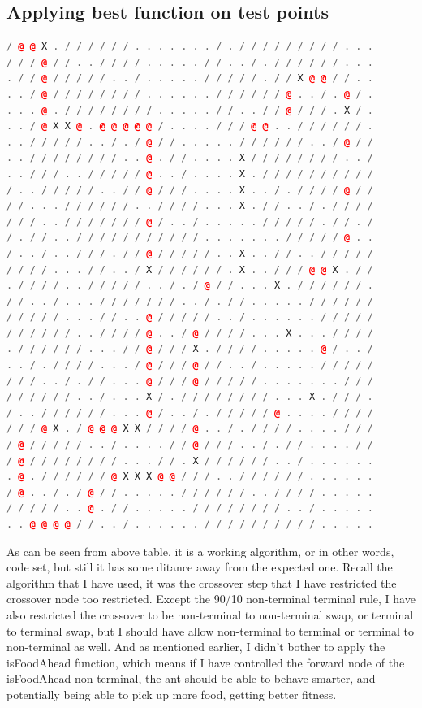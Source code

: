 \documentclass[10pt,b5paper]{article}
\begin{document}
\subsection{Applying best function on test points}
\label{sec-2-2}
\begin{lstlisting}[language=c++]
/ @ @ X . / / / / / / . . . . . . . / . / / / / / / / / / . . . 
/ / / @ / / . . / / / / . . . . . / / . . / . / / / / / / . . . 
. / / @ / / / / / . . / . . . . . / / / / / . / / X @ @ / / . . 
. . / @ / / / / / / / / . . . . . . / / / / / / @ . . / . @ / . 
. . . @ . / / / / / / / / . . . . . / / . . / / @ / / / . X / . 
. . / @ X X @ . @ @ @ @ @ / . . . . / / / @ @ . . / / / / / / . 
. . / / / / / . . / . / @ / / . . . . . / / / / / / . . / @ / / 
. . / / / / / / / / . . @ . / / . . . . X / / / / / / / / . . / 
. . / / / . . / / / / / @ . . / . . . . X . / / / / / / / / / / 
/ . . / / / / / . . / / @ / / / . . . . X . . / . / / / / @ / / 
/ / . . . / / / / / / . . / / / / . . . X . / / . . / . / / / / 
/ / / . . / / / / / / / @ / . . / . . . . . / / / / / . / / . / 
/ . / / . . / / / / / / / / / / / . . . . . . . / / / / / @ . . 
/ . . / . . / / / . / / @ / / / / / . . X . . / / . . / / / / / 
/ / / / . . . / / . . / X / / / / / / . X . . / / / @ @ X . / / 
. / / / / . . / / / / / . . / . / @ / / . . . X . / / / / / / . 
/ / . . / . . . / / / / / / / . . / . / / . . . . . / / / / / / 
/ / / / / . . . / / . . @ / / / / / . . / . . . . . . / / / / / 
/ / / / / / . . / / / / @ . . / @ / / / / . . . X . . . / / / / 
. / / / / / / . . . / / @ / / / X . / / / / . . . . . @ / . . / 
. . / . / / / / . . . / @ / / / @ / / . . / . . . . . / / / / / 
/ / / . . / . / / . . . @ / / / @ / / / / / . . . . . . . / / / 
/ / / / / / . . / . . . X / . / / / / / / / / . . . X . / / / . 
/ . . / / / / / / . . . @ / . . / . / / / / / @ . . . . / / / / 
/ / / @ X . / @ @ @ X X / / / / @ . . / . / / / / . . . . / / / 
/ @ / / / / / . . / . . . . / / @ / / / . . / . / / . . . . / / 
/ @ / / / / / / / / . . . / / . X / / / / / / . . / . . . . . . 
. @ . / / / / / / @ X X X @ @ / / / . . / / / / / / . . . . . . 
/ @ . . / . / @ / / . . . . . / / / / / / . . / / / / . . . . . 
/ / / / / . . @ . / / . . . . . / / / / / / / / . . / . . . . . 
. . @ @ @ @ / / . . / . . . . . . / / / / / / / / / / . . . . . 
\end{lstlisting}

As can be seen from above table, it is a working algorithm, or in other words, code set, but still it has some ditance away from the expected one. Recall the algorithm that I have used, it was the crossover step that I have restricted the crossover node too restricted. Except the 90/10 non-terminal terminal rule, I have also restricted the crossover to be non-terminal to non-terminal swap, or terminal to terminal swap, but I should have allow non-terminal to terminal or terminal to non-terminal as well. 
And as mentioned earlier, I didn't bother to apply the isFoodAhead function, which means if I have controlled the forward node of the isFoodAhead non-terminal, the ant should be able to behave smarter, and potentially being able to pick up more food, getting better fitness.
\end{document}
